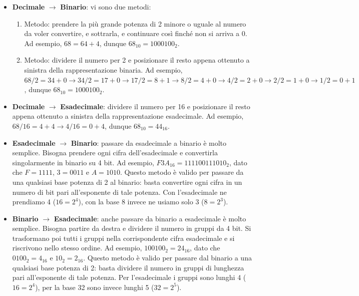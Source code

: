 \documentclass[11pt, a4paper, titlepage, oneside]{scrbook}
\begin{document}
\begin{itemize}
    \item \textbf{Decimale} $\longrightarrow$ \textbf{Binario}: vi sono due metodi:
    \begin{enumerate}[label=\arabic*°]
        \item Metodo: prendere la più grande potenza di 2 minore o uguale al numero da voler convertire, e sottrarla, e continuare così finché non si arriva a 0. Ad esempio, $68 = 64 + 4$, dunque $68_{10} = 1000100_2$.
        \item Metodo: dividere il numero per 2 e posizionare il resto appena ottenuto a sinistra della rappresentazione binaria. Ad esempio, $68/2 = 34 + 0 \longrightarrow 34/2 =  17 + 0 \longrightarrow 17/2 = 8 + 1 \longrightarrow 8/2 = 4 + 0 \longrightarrow 4/2 = 2 + 0 \longrightarrow 2/2 = 1 + 0 \longrightarrow 1/2 = 0 + 1$, dunque $68_{10} = 1000100_2$.
    \end{enumerate}
    \item \textbf{Decimale} $\longrightarrow$ \textbf{Esadecimale}: dividere  il numero per 16 e posizionare il resto appena ottenuto a sinistra della rappresentazione esadecimale. Ad esempio, $68/16 = 4 + 4 \longrightarrow 4/16 = 0 + 4$, dunque $68_{10} = 44_{16}$.
    \item \textbf{Esadecimale} $\longrightarrow$ \textbf{Binario}: passare da esadecimale a binario è molto semplice. Bisogna prendere ogni cifra dell'esadecimale e convertirla singolarmente in binario su 4 bit. Ad esempio, $F3A_{16} = 111100111010_2$, dato che $F = 1111$, $3 = 0011$ e $A = 1010$. Questo metodo è valido per passare da una qualsiasi base potenza di 2 al binario: basta convertire ogni cifra in un numero di bit pari all'esponente di tale potenza. Con l'esadecimale ne prendiamo 4 ($16 = 2^4$), con la base 8 invece ne usiamo solo 3 ($8 = 2^3$).
    \item \textbf{Binario} $\longrightarrow$ \textbf{Esadecimale}: anche passare da binario a esadecimale è molto semplice. Bisogna partire da destra e dividere il numero in gruppi da 4 bit. Si trasformano poi tutti i gruppi nella corrispondente cifra esadecimale e si riscrivono nello stesso ordine. Ad esempio, $100100_2 = 24_{16}$, dato che $0100_2 = 4_{16}$ e $10_2 = 2_{16}$. Questo metodo è valido per passare dal binario a una qualsiasi base potenza di 2: basta dividere il numero in gruppi di lunghezza pari all'esponente di tale potenza. Per l'esadecimale i gruppi sono lunghi 4 ($16 = 2^4$), per la base 32 sono invece lunghi 5 ($32 = 2^5$).
\end{itemize}
\end{document}
